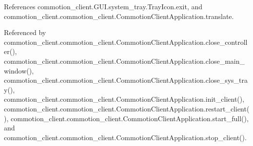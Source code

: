 References commotion\-\_\-client.\-G\-U\-I.\-system\-\_\-tray.\-Tray\-Icon.\-exit, and commotion\-\_\-client.\-commotion\-\_\-client.\-Commotion\-Client\-Application.\-translate.



Referenced by commotion\-\_\-client.\-commotion\-\_\-client.\-Commotion\-Client\-Application.\-close\-\_\-controller(), commotion\-\_\-client.\-commotion\-\_\-client.\-Commotion\-Client\-Application.\-close\-\_\-main\-\_\-window(), commotion\-\_\-client.\-commotion\-\_\-client.\-Commotion\-Client\-Application.\-close\-\_\-sys\-\_\-tray(), commotion\-\_\-client.\-commotion\-\_\-client.\-Commotion\-Client\-Application.\-init\-\_\-client(), commotion\-\_\-client.\-commotion\-\_\-client.\-Commotion\-Client\-Application.\-restart\-\_\-client(), commotion\-\_\-client.\-commotion\-\_\-client.\-Commotion\-Client\-Application.\-start\-\_\-full(), and commotion\-\_\-client.\-commotion\-\_\-client.\-Commotion\-Client\-Application.\-stop\-\_\-client().



